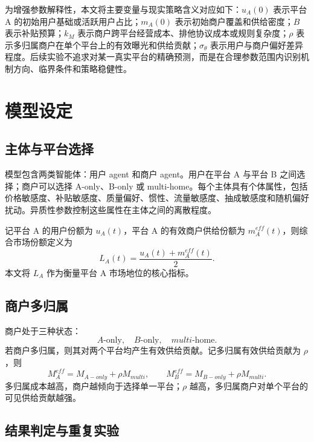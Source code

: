 ﻿\documentclass[UTF8,zihao=-4]{ctexart}
\begin{document}
为增强参数解释性，本文将主要变量与现实策略含义对应如下：$u_A(0)$ 表示平台 A 的初始用户基础或活跃用户占比；$m_A(0)$ 表示初始商户覆盖和供给密度；$B$ 表示补贴预算；$k_M$ 表示商户跨平台经营成本、排他协议成本或规则复杂度；$\rho$ 表示多归属商户在单个平台上的有效曝光和供给贡献；$\sigma_\theta$ 表示用户与商户偏好差异程度。后续实验不追求对某一真实平台的精确预测，而是在合理参数范围内识别机制方向、临界条件和策略稳健性。

\section{模型设定}

\subsection{主体与平台选择}

模型包含两类智能体：用户 agent 和商户 agent。用户在平台 A 与平台 B 之间选择；商户可以选择 A-only、B-only 或 multi-home。每个主体具有个体属性，包括价格敏感度、补贴敏感度、质量偏好、惯性、流量敏感度、抽成敏感度和随机偏好扰动。异质性参数控制这些属性在主体之间的离散程度。

记平台 A 的用户份额为 $u_A(t)$，平台 A 的有效商户供给份额为 $m_A^{eff}(t)$，则综合市场份额定义为
\begin{equation}
L_A(t)=\frac{u_A(t)+m_A^{eff}(t)}{2}.
\end{equation}
本文将 $L_A$ 作为衡量平台 A 市场地位的核心指标。

\subsection{商户多归属}

商户处于三种状态：
\begin{equation}
A\text{-only},\quad B\text{-only},\quad multi\text{-home}.
\end{equation}
若商户多归属，则其对两个平台均产生有效供给贡献。记多归属有效供给贡献为 $\rho$，则
\begin{equation}
M_A^{eff}=M_{A-only}+\rho M_{multi}, \qquad
M_B^{eff}=M_{B-only}+\rho M_{multi}.
\end{equation}
多归属成本越高，商户越倾向于选择单一平台；$\rho$ 越高，多归属商户对单个平台的可见供给贡献越强。

\subsection{结果判定与重复实验}
\end{document}
